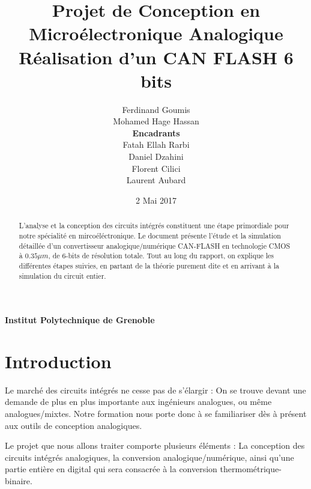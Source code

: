 \documentclass[11pt]{article}
\begin{document}
\title{\textbf{Projet de Conception en Micro\'electronique Analogique} \\ R\'ealisation d'un CAN FLASH 6 bits}
\author{Ferdinand Goumis \\ Mohamed Hage Hassan \medskip\\\medskip \textbf{Encadrants} \medskip \\ Fatah Ellah Rarbi \\ Daniel Dzahini \\ Florent Cilici \\ Laurent Aubard}
\date{2 Mai 2017}
\maketitle
\thispagestyle{empty}

\renewcommand{\abstractname}{Pr\'emabule}

\begin{abstract}
L'analyse et la conception des circuits int\'egr\'es constituent une \'etape primordiale pour notre sp\'ecialit\'e en mirco\'el\'ectronique. Le document pr\'esente l'\'etude et la simulation d\'etaill\'ee d'un convertisseur analogique/num\'erique CAN-FLASH en technologie CMOS \`a $0.35 \mu m$, de 6-bits de r\'esolution totale. Tout au long du rapport, on explique les diff\'erentes \'etapes suivies, en partant de la th\'eorie purement dite et en arrivant \`a la simulation du circuit entier.
  
\end{abstract}

\vskip 9.5cm
\begin{center} \textbf{Institut Polytechnique de Grenoble} \end{center}

\clearpage

\tableofcontents
\clearpage

\section{Introduction}

Le march\'e des circuits int\'egr\'es ne cesse pas de s'\'elargir : On se trouve devant une demande de plus en plus importante aux ing\'enieurs analogues, ou m\^eme analogues/mixtes. Notre formation nous porte donc \`a se familiariser d\`es \`a pr\'esent aux outils de conception analogiques. 

Le projet que nous allons traiter comporte plusieurs \'el\'ements : La conception des circuits int\'egr\'es analogiques, la conversion analogique/num\'erique, ainsi qu'une partie enti\`ere en digital qui sera consacr\'ee \`a la conversion thermom\'etrique-binaire.
\end{document}
